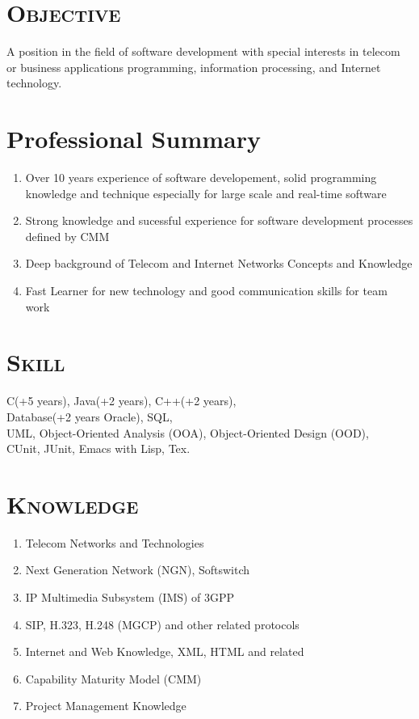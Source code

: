 \documentclass[margin,11pt]{res}
\begin{document}
\begin{resume}
 
\section{\textsc{Objective}}  A position in the field of software development with special 
                interests in telecom or business applications programming, 
                information processing, and Internet technology. 

\section{Professional Summary}

\begin{enumerate}
    \item Over 10 years experience of software developement, solid programming knowledge and
      technique especially for large scale and real-time software
    \item Strong knowledge and sucessful experience for software development processes defined by CMM
    \item Deep background of Telecom and Internet Networks Concepts and Knowledge
    \item Fast Learner for new technology and good communication skills for team work
\end{enumerate}

\section{\textsc{Skill}} 
   C(+5 years), Java(+2 years), C++(+2 years), \\
   Database(+2 years Oracle), SQL,\\
   UML, Object-Oriented Analysis (OOA),  Object-Oriented Design (OOD),\\
   CUnit, JUnit, Emacs with Lisp, Tex.

\section{\textsc{Knowledge}} 
\begin{enumerate}
    \item Telecom Networks and Technologies
    \item Next Generation Network (NGN), Softswitch
    \item IP Multimedia Subsystem (IMS) of 3GPP
    \item SIP, H.323, H.248 (MGCP) and other related protocols
    \item Internet and Web Knowledge, XML, HTML and related
    \item Capability Maturity Model (CMM)
    \item Project Management Knowledge
\end{enumerate}
 

\end{resume}
\end{document}
